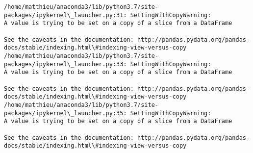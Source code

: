 \documentclass[11pt]{article}
\begin{document}
    \begin{Verbatim}[commandchars=\\\{\}]
/home/matthieu/anaconda3/lib/python3.7/site-packages/ipykernel\_launcher.py:31: SettingWithCopyWarning: 
A value is trying to be set on a copy of a slice from a DataFrame

See the caveats in the documentation: http://pandas.pydata.org/pandas-docs/stable/indexing.html\#indexing-view-versus-copy
/home/matthieu/anaconda3/lib/python3.7/site-packages/ipykernel\_launcher.py:33: SettingWithCopyWarning: 
A value is trying to be set on a copy of a slice from a DataFrame

See the caveats in the documentation: http://pandas.pydata.org/pandas-docs/stable/indexing.html\#indexing-view-versus-copy
/home/matthieu/anaconda3/lib/python3.7/site-packages/ipykernel\_launcher.py:35: SettingWithCopyWarning: 
A value is trying to be set on a copy of a slice from a DataFrame

See the caveats in the documentation: http://pandas.pydata.org/pandas-docs/stable/indexing.html\#indexing-view-versus-copy

    \end{Verbatim}
\end{document}
